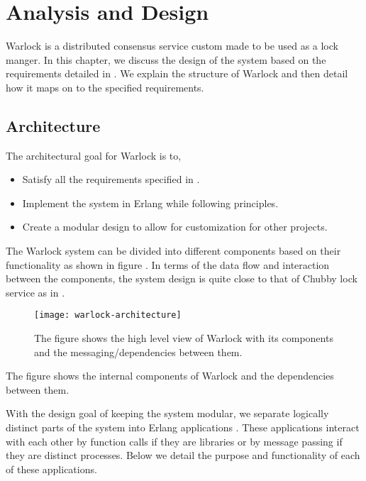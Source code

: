 \chapter{Analysis and Design}
\label{chapter:analysis.design}

Warlock is a distributed consensus service custom made to be used as a
lock manger. In this chapter, we discuss the design of the system based on the
requirements detailed in . We explain the structure
of Warlock and then detail how it maps on to the specified requirements.

\section{Architecture}

The architectural goal for Warlock is to,

\begin{itemize}
  \item Satisfy all the requirements specified in .
  \item Implement the system in Erlang while following  principles.
  \item Create a modular design to allow for customization for other projects.
\end{itemize}

The Warlock system can be divided into different components based on their
functionality as shown in figure . In terms of the
data flow and interaction between the components, the system design is quite
close to that of Chubby lock service \citep{Burrows06} as in
.

\begin{figure}
  \begin{whole}
  \texttt{[image: warlock-architecture]}
  \caption[Warlock Architecture]{%
    The figure shows the high level view of Warlock with its components and the
    messaging/dependencies between them.}
    \label{figure:warlock.arch}
  \normalcaption
  \end{whole}
\end{figure}

The figure shows the internal components of Warlock and the dependencies between
them.

With the design goal of keeping the system modular, we separate logically 
distinct parts of the system into Erlang applications .
These applications interact with each other by function calls if they are 
libraries or by message passing if they are distinct processes. Below we
detail the purpose and functionality of each of these applications.

